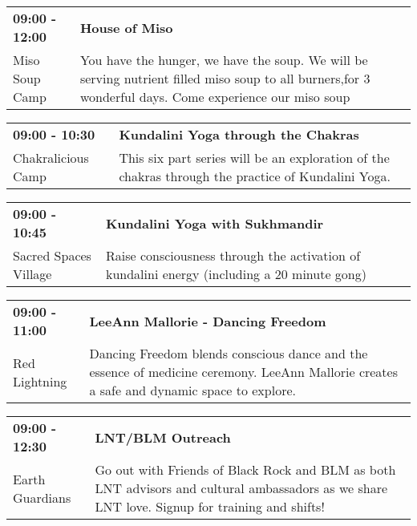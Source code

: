\begin{tabular}{ p{1in} p{2.2in} }
    \textbf{09:00 - 12:00} & \textbf{House of Miso } \\
    Miso Soup Camp \newline  & You have the hunger, we have the soup. We will be serving nutrient filled miso soup to all burners,for 3 wonderful days. Come experience our miso soup \\
    \hline 
\end{tabular}
    
\begin{tabular}{ p{1in} p{2.2in} }
    \textbf{09:00 - 10:30} & \textbf{Kundalini Yoga through the Chakras} \\
    Chakralicious Camp \newline  & This six part series will be an exploration of the chakras through the practice of Kundalini Yoga. \\
    \hline 
\end{tabular}
    
\begin{tabular}{ p{1in} p{2.2in} }
    \textbf{09:00 - 10:45} & \textbf{Kundalini Yoga with Sukhmandir} \\
    Sacred Spaces Village \newline  & Raise consciousness through the activation of kundalini energy (including a 20 minute gong) \\
    \hline 
\end{tabular}
    
\begin{tabular}{ p{1in} p{2.2in} }
    \textbf{09:00 - 11:00} & \textbf{LeeAnn Mallorie - Dancing Freedom} \\
    Red Lightning \newline  & Dancing Freedom blends conscious dance and the essence of medicine ceremony. LeeAnn Mallorie creates a safe and dynamic space to explore. \\
    \hline 
\end{tabular}
    
\begin{tabular}{ p{1in} p{2.2in} }
    \textbf{09:00 - 12:30} & \textbf{LNT/BLM Outreach } \\
    Earth Guardians \newline  & Go out with Friends of Black Rock and BLM as both LNT advisors and cultural ambassadors as we share LNT love. Signup for training and shifts! \\
    \hline 
\end{tabular}
    
